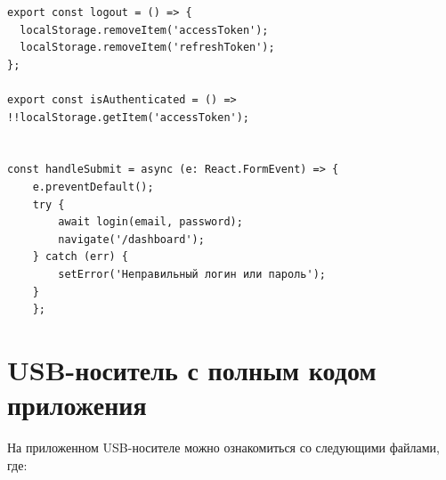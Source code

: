 \documentclass[diploma]{SCWorks}
\begin{document}
\begin{verbatim}
export const logout = () => {
  localStorage.removeItem('accessToken');
  localStorage.removeItem('refreshToken');
};

export const isAuthenticated = () => !!localStorage.getItem('accessToken');


const handleSubmit = async (e: React.FormEvent) => {
    e.preventDefault();
    try {
        await login(email, password);
        navigate('/dashboard');
    } catch (err) {
        setError('Неправильный логин или пароль');
    }
    };
\end{verbatim}

\section{USB-носитель с полным кодом приложения}
\label{appendC}
На приложенном USB-носителе можно ознакомиться со следующими файлами, где:
\end{document}
